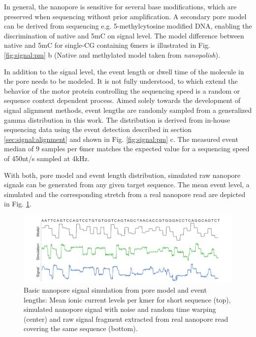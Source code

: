 In general, the nanopore is sensitive for several base modifications, which are preserved when sequencing without prior amplification. A secondary pore model can be derived from sequencing e.g. 5-methylcytosine modified DNA, enabling the discrimination of native and 5mC on signal level. The model difference between native and 5mC for single-CG containing 6mers is illustrated in Fig. \ref{fig:signal:pm} b (Native and methylated model taken from \textit{nanopolish}).

In addition to the signal level, the event length or dwell time of the molecule in the pore needs to be modeled. It is not fully understood, to which extend the behavior of the motor protein controlling the sequencing speed is a random or sequence context dependent process. Aimed solely towards the development of signal alignment methods, event lengths are randomly sampled from a generalized gamma distribution in this work. 
The distribution is derived from in-house sequencing data using the event detection described in section \ref{sec:signal:alignment} and shown in Fig. \ref{fig:signal:pm} c. The measured event median of 9 samples per 6mer matches the expected value for a sequencing speed of 450nt/s sampled at 4kHz.

With both, pore model and event length distribution, simulated raw nanopore signals can be generated from any given target sequence. The mean event level, a simulated and the corresponding stretch from a real nanopore read are depicted in Fig. \ref{fig:signal:simulation}.

\begin{figure}[h]
	\centering
	\includegraphics[width=1.0\textwidth]{figures/signal/simulation.pdf}
	\captionsetup{format=plain}
	\caption[Basic signal simulation]{Basic nanopore signal simulation from pore model and event lengths: Mean ionic current levels per kmer for short sequence (top), simulated nanopore signal with noise and random time warping (center) and raw signal fragment extracted from real nanopore read covering the same sequence (bottom).}
	\label{fig:signal:simulation}
\end{figure}

